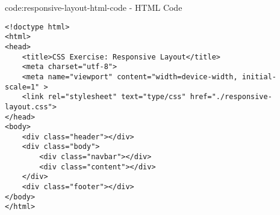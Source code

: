 \begin{codeenv}{code:responsive-layout-html-code}{ - HTML Code}
\begin{verbatim}
<!doctype html>
<html>
<head>
    <title>CSS Exercise: Responsive Layout</title>
    <meta charset="utf-8">
    <meta name="viewport" content="width=device-width, initial-scale=1" >
    <link rel="stylesheet" text="type/css" href="./responsive-layout.css">
</head>
<body>
    <div class="header"></div>
    <div class="body">
        <div class="navbar"></div>
        <div class="content"></div>
    </div>
    <div class="footer"></div>
</body>
</html>
\end{verbatim}
\end{codeenv}
